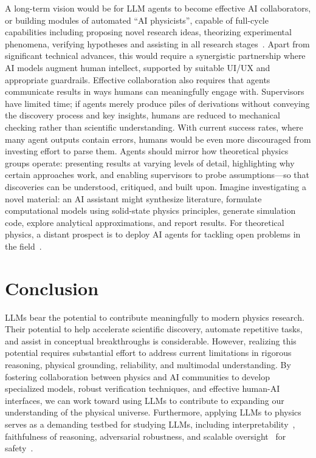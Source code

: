 A long-term vision would be for LLM agents to become effective AI collaborators, or building modules of automated ``AI physicists'', capable of full-cycle capabilities including proposing novel research ideas, theorizing experimental phenomena, verifying hypotheses and assisting in all research stages~\cite{Wang2023Scientific,Lu2024AI}. Apart from significant technical advances, this would require a synergistic partnership where AI models augment human intellect, supported by suitable UI/UX and appropriate guardrails.
Effective collaboration also requires that agents communicate results in ways humans can meaningfully engage with. Supervisors have limited time; if agents merely produce piles of derivations without conveying the discovery process and key insights, humans are reduced to mechanical checking rather than scientific understanding. With current success rates, where many agent outputs contain errors, humans would be even more discouraged from investing effort to parse them. Agents should mirror how theoretical physics groups operate: presenting results at varying levels of detail, highlighting why certain approaches work, and enabling supervisors to probe assumptions---so that discoveries can be understood, critiqued, and built upon.
Imagine investigating a novel material: an AI assistant might synthesize literature, formulate computational models using solid-state physics principles, generate simulation code, explore analytical approximations, and report results.
For theoretical physics, a distant prospect is to deploy AI agents for tackling open problems in the field~\cite{InstituteForQuantumOpticsAndQuantumInformationVienna2025Open,Horodecki2020Five}.
\section{Conclusion}
\label{sec:conclusion}
LLMs bear the potential to contribute meaningfully to modern physics research. Their potential to help accelerate scientific discovery, automate repetitive tasks, and assist in conceptual breakthroughs is considerable. However, realizing this potential requires substantial effort to address current limitations in rigorous reasoning, physical grounding, reliability, and multimodal understanding.
By fostering collaboration between physics and AI communities to develop specialized models, robust verification techniques, and effective human-AI interfaces, we can work toward using LLMs to contribute to expanding our understanding of the physical universe. Furthermore, applying LLMs to physics serves as a demanding testbed for studying LLMs, including interpretability~\cite{Hanna2023How},
faithfulness of reasoning, adversarial robustness, and scalable oversight~\cite{Bowman2022Measuring} for safety~\cite{Bengio2024Managing}.